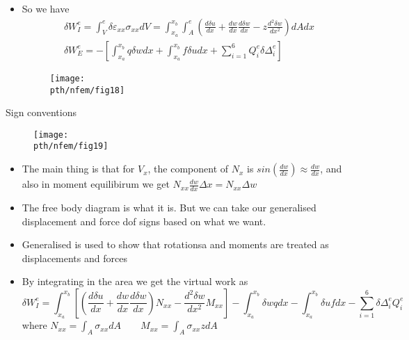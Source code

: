 	\begin{frame}
		\begin{itemize}
			\item So we have
			\begin{equation}
			\begin{aligned}
			\delta W_I^e = \int_V^e \delta \varepsilon_{xx} \sigma_{xx} dV = \int_{x_a}^{x_b} \int_A^e \left(\frac{d \delta u}{dx} + \frac{dw}{dx}\frac{d\delta w}{dx} - z \frac{d^2\delta w}{dx^2} \right) dA dx \\
			\delta W^e_E = - \left[\int_{x_a}^{x_b} q \delta w dx + \int_{x_a}^{x_b} f \delta u dx + \sum_{i=1}^{6}Q_i^e \delta \Delta_i^e \right] 
			\end{aligned}
			\end{equation}	
			\begin{figure}
				\centering
				\texttt{[image: \\pth/nfem/fig18]} 		
			\end{figure}
			
		\end{itemize}
	\end{frame}


	\begin{frame}{Sign conventions}
		\begin{figure}
			\centering
			\texttt{[image: \\pth/nfem/fig19]} 		
		\end{figure}	
		\begin{itemize}
			\item The main thing is that for $V_x$, the component of $N_x$ is $sin(\frac{dw}{dx}) \approx \frac{dw}{dx}$, and also in moment equilibirum we get $N_{xx}\frac{dw}{dx}\Delta x = N_{xx}\Delta w$
			
		\end{itemize}
	\end{frame}


	\begin{frame}
		\begin{itemize}
			\item The free body diagram is what it is. But we can take our generalised displacement and force dof signs based on what we want.
			\item Generalised is used to show that rotationsa and moments are treated as displacements and forces
			\item By integrating in the area we get the virtual work as 
			\begin{equation}
				\delta W_I^e = \int_{x_a}^{x_b} \left[  \left(\frac{d \delta u}{dx} 
				+ \frac{dw}{dx}\frac{d\delta w}{dx} \right)N_{xx} - \frac{d^2 \delta w}{dx^2} M_{xx}\right] - \int_{x_a}^{x_b} \delta w q dx - \int_{x_a}^{x_b} \delta u f dx  - \sum_{i=1}^{6} \delta \Delta_i^e Q_i^e
			\end{equation}
			where $N_{xx} = \int_A \sigma_{xx}dA \qquad M_{xx} = \int_A \sigma_{xx}zdA$ 
		\end{itemize}
	\end{frame}


